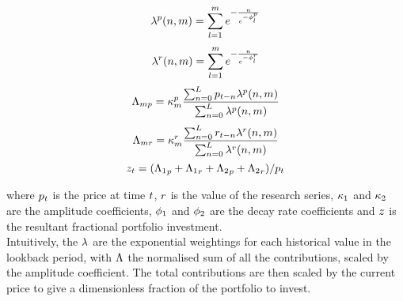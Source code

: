 \documentclass{article}
\begin{document}
\begin{equation}
\lambda^{p}(n,m) = \sum_{l = 1}^{m} e^{- \frac{ n}{e^{-\phi_l^p}}}
\end{equation}
\begin{equation}
\lambda^{r}(n,m) = \sum_{l = 1}^{m} e^{- \frac{ n}{e^{-\phi_l^r}}}
\end{equation}
\begin{equation}
{\Lambda}_{m p} = \kappa_{m}^{p} \frac{\sum_{n=0}^{L} p_{t - n} \lambda^{p}(n, m)}{\sum_{n = 0}^{L} \lambda^{p}(n, m)} \\
\end{equation}
\begin{equation}
\Lambda_{m  r} = \kappa_{m}^{r} \frac{\sum_{n=0}^{L} r_{t - n} \lambda^{r}(n, m)}{\sum_{n = 0}^{L} \lambda^{r}(n, m)} \\
\end{equation}
\begin{equation}
z_{t} = ({\Lambda_{1}}_{p} + {\Lambda_{1}}_{r} + {\Lambda_{2}}_{p} + {\Lambda_{2}}_{r})/{p}_{t} \\
\end{equation}
\hspace{200mm}

\noindent where $p_t$ is the price at time $t$, $r$ is the value of the research series, $\kappa_{1}$ and $\kappa_{2}$ are the amplitude coefficients, $\phi_{1}$ and $\phi_{2}$ are the decay rate coefficients and $z$ is the resultant fractional portfolio investment.\\
Intuitively, the $\lambda$ are the exponential weightings for each historical value in the lookback period, with $\Lambda$ the normalised sum of all the contributions, scaled by the amplitude coefficient. The total contributions are then scaled by the current price to give a dimensionless fraction of the portfolio to invest.
\hspace{200mm}
\hspace{200mm}

\keyterms
\furtherlinks
\end{document}

